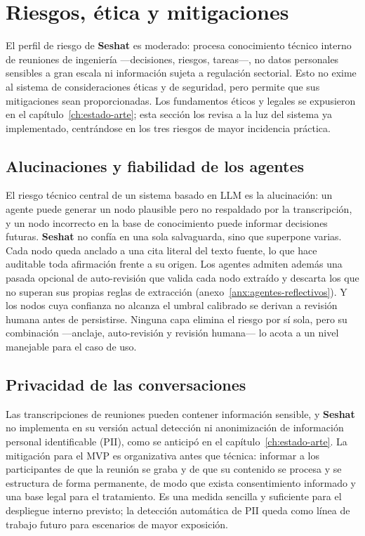 \section{Riesgos, ética y mitigaciones}
\label{sec:riesgos}

El perfil de riesgo de \textbf{Seshat} es moderado: procesa conocimiento técnico interno de
reuniones de ingeniería —decisiones, riesgos, tareas—, no datos personales sensibles a gran escala
ni información sujeta a regulación sectorial. Esto no exime al sistema de consideraciones éticas y
de seguridad, pero permite que sus mitigaciones sean proporcionadas. Los fundamentos éticos y
legales se expusieron en el capítulo~\ref{ch:estado-arte}; esta sección los revisa a la luz del
sistema ya implementado, centrándose en los tres riesgos de mayor incidencia práctica.

\subsection{Alucinaciones y fiabilidad de los agentes}

El riesgo técnico central de un sistema basado en \ac{LLM} es la alucinación: un agente puede
generar un nodo plausible pero no respaldado por la transcripción, y un nodo incorrecto en la base
de conocimiento puede informar decisiones futuras. \textbf{Seshat} no confía en una sola salvaguarda,
sino que superpone varias. Cada nodo queda anclado a una cita literal del texto fuente, lo que hace
auditable toda afirmación frente a su origen. Los agentes admiten además una pasada opcional de
auto-revisión que valida cada nodo extraído y descarta los que no superan sus propias reglas de
extracción (anexo~\ref{anx:agentes-reflectivos}). Y los nodos cuya confianza no alcanza el umbral
calibrado se derivan a revisión humana antes de persistirse. Ninguna capa elimina el riesgo por sí
sola, pero su combinación —anclaje, auto-revisión y revisión humana— lo acota a un nivel manejable
para el caso de uso.

\subsection{Privacidad de las conversaciones}

Las transcripciones de reuniones pueden contener información sensible, y \textbf{Seshat} no
implementa en su versión actual detección ni anonimización de información personal identificable
(PII), como se anticipó en el capítulo~\ref{ch:estado-arte}. La mitigación para el \ac{MVP} es
organizativa antes que técnica: informar a los participantes de que la reunión se graba y de que su
contenido se procesa y se estructura de forma permanente, de modo que exista consentimiento
informado y una base legal para el tratamiento. Es una medida sencilla y suficiente para el
despliegue interno previsto; la detección automática de PII queda como línea de trabajo futuro para
escenarios de mayor exposición.

